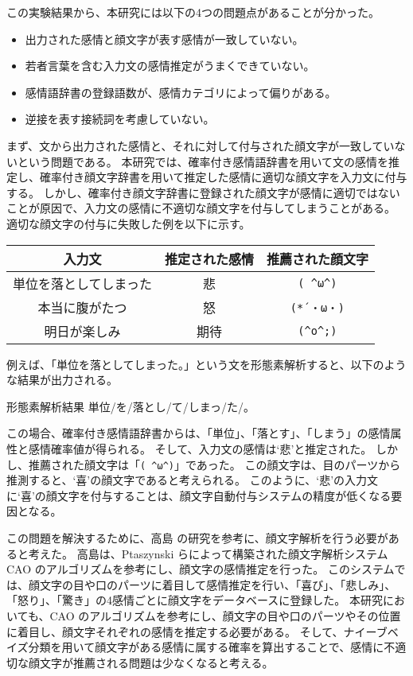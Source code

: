 \documentclass[11pt,a4j]{jsarticle}
\begin{document}
この実験結果から、本研究には以下の4つの問題点があることが分かった。

\begin{itemize}
  \item 出力された感情と顔文字が表す感情が一致していない。
  \item 若者言葉を含む入力文の感情推定がうまくできていない。
  \item 感情語辞書の登録語数が、感情カテゴリによって偏りがある。
  \item 逆接を表す接続詞を考慮していない。
  \end{itemize}

まず、文から出力された感情と、それに対して付与された顔文字が一致していないという問題である。
本研究では、確率付き感情語辞書を用いて文の感情を推定し、確率付き顔文字辞書を用いて推定した感情に適切な顔文字を入力文に付与する。
しかし、確率付き顔文字辞書に登録された顔文字が感情に適切ではないことが原因で、入力文の感情に不適切な顔文字を付与してしまうことがある。
適切な顔文字の付与に失敗した例を以下に示す。

\begin{table}[htb]
  \centering
  \begin{tabular}{c||c|c} \hline
    入力文 & 推定された感情 & 推薦された顔文字 \\ \hline
    単位を落としてしまった & 悲 & \verb|( ^ω^)| \\
    本当に腹がたつ & 怒 & \verb|(*´・ω・)|   \\
    明日が楽しみ & 期待 & \verb|(^o^;)| \\ \hline
  \end{tabular}
\end{table}

例えば、「単位を落としてしまった。」という文を形態素解析すると、以下のような結果が出力される。

\begin{itembox}{形態素解析結果}
単位/を/落とし/て/しまっ/た/。
\end{itembox}

この場合、確率付き感情語辞書からは、「単位」、「落とす」、「しまう」の感情属性と感情確率値が得られる。
そして、入力文の感情は`悲'と推定された。
しかし、推薦された顔文字は「\verb|( ^ω^)|」であった。
この顔文字は、目のパーツから推測すると、`喜'の顔文字であると考えられる。
このように、`悲'の入力文に`喜'の顔文字を付与することは、顔文字自動付与システムの精度が低くなる要因となる。

この問題を解決するために、高島  の研究を参考に、顔文字解析を行う必要があると考えた。
高島は、Ptaszynski らによって構築された顔文字解析システム CAO のアルゴリズムを参考にし、顔文字の感情推定を行った。
このシステムでは、顔文字の目や口のパーツに着目して感情推定を行い、「喜び」、「悲しみ」、「怒り」、「驚き」の4感情ごとに顔文字をデータベースに登録した。
本研究においても、CAO のアルゴリズムを参考にし、顔文字の目や口のパーツやその位置に着目し、顔文字それぞれの感情を推定する必要がある。
そして、ナイーブベイズ分類を用いて顔文字がある感情に属する確率を算出することで、感情に不適切な顔文字が推薦される問題は少なくなると考える。
\end{document}
